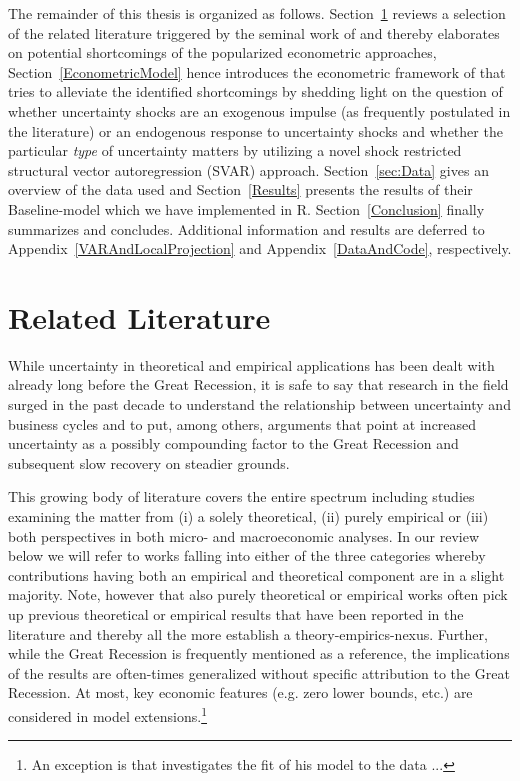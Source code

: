 \documentclass[a4paper,11pt,listof=nochaptergap,oneside,pointednumbers,bibtotoc,bigheadings,liststotoc,hidelinks]{scrbook}
\theoremstyle{mysatz}
\theoremstyle{mydefinition}
\theoremstyle{mytheorem}
\theoremstyle{mybemerkung}
\begin{document}
The remainder of this thesis is organized as follows. Section~\ref{UncertaintyandBusinessCyclesRelatedLiterature} reviews a selection of the related literature triggered by the seminal work of \citet{bloom:09} and thereby elaborates on potential shortcomings of the popularized econometric approaches, Section~\ref{EconometricModel} hence introduces the econometric framework of \citet{ludvigsonetal:18} that tries to alleviate the identified shortcomings by shedding light on the question of whether uncertainty shocks are an exogenous impulse (as frequently postulated in the literature) or an endogenous response to uncertainty shocks and whether the particular \textit{type} of uncertainty matters by utilizing a novel shock restricted structural vector autoregression (SVAR) approach. Section~\ref{sec:Data} gives an overview of the data used and Section~\ref{Results} presents the results of their Baseline-model which we have implemented in R. Section~\ref{Conclusion} finally summarizes and concludes. Additional information and results are deferred to Appendix~\ref{VARAndLocalProjection} and Appendix~\ref{DataAndCode}, respectively.



\chapter{Related Literature}
\label{UncertaintyandBusinessCyclesRelatedLiterature}

While uncertainty in theoretical and empirical applications has been dealt with already long before the Great Recession, it is safe to say that research in the field surged in the past decade to understand the relationship between uncertainty and business cycles and to put, among others, arguments that point at increased uncertainty as a possibly compounding factor to the Great Recession and subsequent slow recovery on steadier grounds. 

This growing body of literature covers the entire spectrum including studies examining the matter from (i) a solely theoretical, (ii) purely empirical or (iii) both perspectives in both micro- and macroeconomic analyses. In our review below we will refer to works falling into either of the three categories whereby contributions having both an empirical and theoretical component are in a slight majority.  Note, however that also purely theoretical or empirical works often pick up previous theoretical or empirical results that have been reported in the literature and thereby all the more establish a theory-empirics-nexus. Further, while the Great Recession is frequently mentioned as a reference, the implications of the results are often-times generalized without specific attribution to the Great Recession. At most, key economic features (e.g. zero lower bounds, etc.) are considered in model extensions.\footnote{An exception is \citet{schaal:17} that investigates the fit of his model to the data  ...} 
\end{document}
